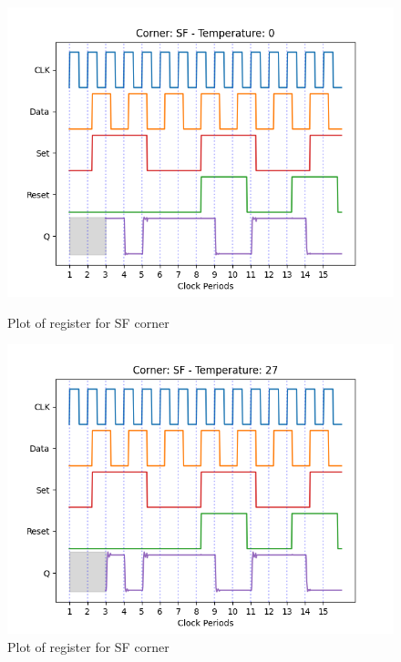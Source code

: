 \begin{figure}[H]
    \begin{minipage}{0.5\textwidth}
        \centering
        \includegraphics[width=\textwidth]{Figures/Aimspice_Plots/SF_0.png}
        \caption{Plot of register for SF corner}
        \label{fig:SF0}
    \end{minipage}%
    \begin{minipage}{0.5\textwidth}
        \centering
        \includegraphics[width=\textwidth]{Figures/Aimspice_Plots/SF_27.png}
        \caption{Plot of register for SF corner}
        \label{fig:SF27}
    \end{minipage}
\end{figure}
